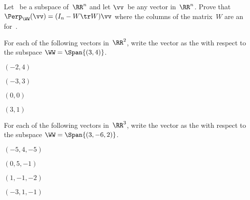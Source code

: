 \begin{exercise} \label{ex:perpn} 
Let \WW\ be a {subspace} of~\(\RR^n\) and let \(\vv\)~be any vector in~\(\RR^n\). 
Prove that \(\Perp_\WW(\vv)=(I_n-W\tr W)\vv\) where the columns of the matrix~\(W\) are an  for~\WW.
\end{exercise}



\begin{reduce}
\begin{exercise}  
For each of the following vectors in~\(\RR^2\), write the vector as the  with respect to the subspace \(\WW=\Span\{(3,4)\}\).  
\begin{Parts}
\item \((-2,4)\)

\item \((-3,3)\)

\item \((0,0)\)

\item \((3,1)\)

\end{Parts}
\end{exercise}




\begin{exercise}  
For each of the following vectors in~\(\RR^3\), write the vector as the  with respect to the subspace \(\WW=\Span\{(3,-6,2)\}\).  
\begin{Parts}
\item \((-5,4,-5)\)

\item \((0,5,-1)\)

\item \((1,-1,-2)\)

\item \((-3,1,-1)\)


\end{Parts}
\end{exercise}
\end{reduce}
